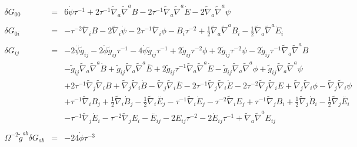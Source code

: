 \documentclass[10pt,letterpaper]{article}
\numberwithin{equation}{section}
\begin{document}
\begin{eqnarray}
\\ \nonumber\\
\delta G_{00} &=& 6 \dot{\psi} \tau^{-1} + 2 \tau^{-1} \tilde{\nabla}_{a}\tilde{\nabla}^{a}B - 2 \tau^{-1} \tilde{\nabla}_{a}\tilde{\nabla}^{a}\dot{E} - 2 \tilde{\nabla}_{a}\tilde{\nabla}^{a}\psi 
\\ \nonumber\\
\delta G_{0i} &=&- \tau^{-2} \tilde{\nabla}_{i}B - 2 \tilde{\nabla}_{i}\dot{\psi} - 2 \tau^{-1} \tilde{\nabla}_{i}\phi 
- B_{i} \tau^{-2} + \tfrac{1}{2} \tilde{\nabla}_{a}\tilde{\nabla}^{a}B_{i} -  \tfrac{1}{2} \tilde{\nabla}_{a}\tilde{\nabla}^{a}\dot{E}_{i}
\\ \nonumber\\
\delta G_{ij}&=&-2 \overset{..}{\psi} \tilde{g}_{ij}
- 2 \dot{\phi} \tilde{g}_{ij} \tau^{-1}
- 4 \dot{\psi} \tilde{g}_{ij} \tau^{-1}
+ 2 \tilde{g}_{ij} \tau^{-2} \phi
+ 2 \tilde{g}_{ij} \tau^{-2} \psi
- 2 \tilde{g}_{ij} \tau^{-1} \tilde{\nabla}_{a}\tilde{\nabla}^{a}B\nonumber\\
&& -  \tilde{g}_{ij} \tilde{\nabla}_{a}\tilde{\nabla}^{a}\dot{B}
+ \tilde{g}_{ij} \tilde{\nabla}_{a}\tilde{\nabla}^{a}\overset{..}{E}
+ 2 \tilde{g}_{ij} \tau^{-1} \tilde{\nabla}_{a}\tilde{\nabla}^{a}\dot{E}
-  \tilde{g}_{ij} \tilde{\nabla}_{a}\tilde{\nabla}^{a}\phi
+ \tilde{g}_{ij} \tilde{\nabla}_{a}\tilde{\nabla}^{a}\psi\nonumber\\
&& + 2 \tau^{-1} \tilde{\nabla}_{j}\tilde{\nabla}_{i}B
+ \tilde{\nabla}_{j}\tilde{\nabla}_{i}\dot{B}
-  \tilde{\nabla}_{j}\tilde{\nabla}_{i}\overset{..}{E}
- 2 \tau^{-1} \tilde{\nabla}_{j}\tilde{\nabla}_{i}\dot{E}
- 2 \tau^{-2} \tilde{\nabla}_{j}\tilde{\nabla}_{i}E
+ \tilde{\nabla}_{j}\tilde{\nabla}_{i}\phi
-  \tilde{\nabla}_{j}\tilde{\nabla}_{i}\psi
\nonumber\\
&&+\tau^{-1} \tilde{\nabla}_{i}B_{j}
+ \tfrac{1}{2} \tilde{\nabla}_{i}\dot{B}_{j}
-  \tfrac{1}{2} \tilde{\nabla}_{i}\overset{..}{E}_{j}
-  \tau^{-1} \tilde{\nabla}_{i}\dot{E}_{j}
-  \tau^{-2} \tilde{\nabla}_{i}E_{j}
+ \tau^{-1} \tilde{\nabla}_{j}B_{i}
+ \tfrac{1}{2} \tilde{\nabla}_{j}\dot{B}_{i}
-  \tfrac{1}{2} \tilde{\nabla}_{j}\overset{..}{E}_{i}\nonumber\\
&& -  \tau^{-1} \tilde{\nabla}_{j}\dot{E}_{i}
-  \tau^{-2} \tilde{\nabla}_{j}E_{i}
- \overset{..}{E}_{ij}
- 2 E_{ij} \tau^{-2}
- 2 \dot{E}_{ij} \tau^{-1}
+ \tilde{\nabla}_{a}\tilde{\nabla}^{a}E_{ij}
\\ \nonumber\\
\Omega^{-2}\tilde g^{ab}\delta G_{ab} &=&
-24 \dot{\phi} \tau^{-3}

\end{eqnarray}
\end{document}
